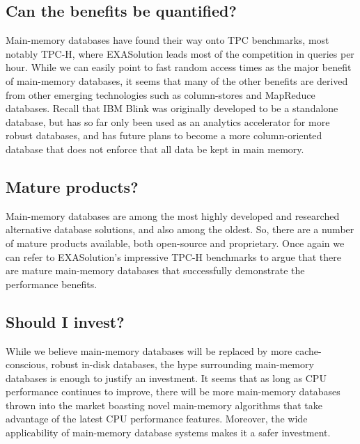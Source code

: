 \documentclass[11pt,a4paper]{report}
\begin{document}
\subsection{Can the benefits be quantified?}
Main-memory databases have found their way onto TPC benchmarks, most notably TPC-H, where EXASolution leads most of the competition in queries per hour. \cite{tpchbm} While we can easily point to fast random access times as the major benefit of main-memory databases, it seems that many of the other benefits are derived from other emerging technologies such as column-stores and MapReduce databases. Recall that IBM Blink was originally developed to be a standalone database, but has so far only been used as an analytics accelerator for more robust databases, and has future plans to become a more column-oriented database that does not enforce that all data be kept in main memory.\cite{inablink}

\subsection{Mature products?}
Main-memory databases are among the most highly developed and researched alternative database solutions, and also among the oldest. So, there are a number of mature products available, both open-source and proprietary. Once again we can refer to EXASolution's impressive TPC-H benchmarks to argue that there are mature main-memory databases that successfully demonstrate the performance benefits.\cite{tpchbm}

\subsection{Should I invest?}
While we believe main-memory databases will be replaced by more cache-conscious, robust in-disk databases, the hype surrounding main-memory databases is enough to justify an investment. It seems that as long as CPU performance continues to improve, there will be more main-memory databases thrown into the market boasting novel main-memory algorithms that take advantage of the latest CPU performance features. Moreover, the wide applicability of main-memory database systems makes it a safer investment.
\end{document}

